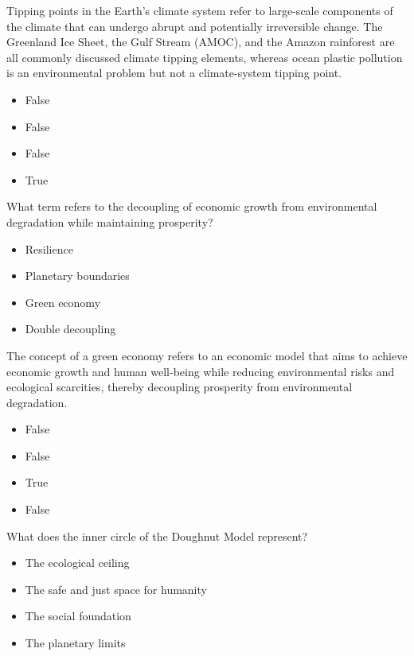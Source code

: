 \documentclass[
  a4paper,
  DIV=11,
  numbers=noendperiod,
  oneside,
  openany]{scrreprt}
\providecommand{\tightlist}{%
  \setlength{\itemsep}{0pt}\setlength{\parskip}{0pt}}
\begin{document}
Tipping points in the Earth's climate system refer to large-scale
components of the climate that can undergo abrupt and potentially
irreversible change. The Greenland Ice Sheet, the Gulf Stream (AMOC),
and the Amazon rainforest are all commonly discussed climate tipping
elements, whereas ocean plastic pollution is an environmental problem
but not a climate-system tipping point.

\begin{itemize}
\tightlist
\item
  False
\item
  False
\item
  False
\item
  True
\end{itemize}

What term refers to the decoupling of economic growth from environmental
degradation while maintaining prosperity?

\begin{itemize}
\tightlist
\item[$\square$]
  Resilience
\item[$\square$]
  Planetary boundaries
\item[$\square$]
  Green economy
\item[$\square$]
  Double decoupling
\end{itemize}

The concept of a green economy refers to an economic model that aims to
achieve economic growth and human well-being while reducing
environmental risks and ecological scarcities, thereby decoupling
prosperity from environmental degradation.

\begin{itemize}
\tightlist
\item
  False
\item
  False
\item
  True
\item
  False
\end{itemize}

What does the inner circle of the Doughnut Model represent?

\begin{itemize}
\tightlist
\item[$\square$]
  The ecological ceiling
\item[$\square$]
  The safe and just space for humanity
\item[$\square$]
  The social foundation
\item[$\square$]
  The planetary limits
\end{itemize}
\end{document}

